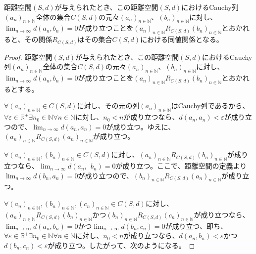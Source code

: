 \documentclass[dvipdfmx]{jsarticle}
\begin{document}
\begin{thm}\label{8.2.6.2}
距離空間$(S,d)$が与えられたとき、この距離空間$(S,d)$におけるCauchy列$\left( a_{n} \right)_{n \in \mathbb{N}}$全体の集合$C(S,d)$の元々$\left( a_{n} \right)_{n \in \mathbb{N}}$、$\left( b_{n} \right)_{n \in \mathbb{N}}$に対し、$\lim_{n \rightarrow \infty}{d\left( a_{n},b_{n} \right)} = 0$が成り立つことを$\left( a_{n} \right)_{n \in \mathbb{N}}R_{C(S,d)}\left( b_{n} \right)_{n \in \mathbb{N}}$とおかれると、その関係$R_{C(S,d)}$はその集合$C(S,d)$における同値関係となる。
\end{thm}
\begin{proof}
距離空間$(S,d)$が与えられたとき、この距離空間$(S,d)$におけるCauchy列$\left( a_{n} \right)_{n \in \mathbb{N}}$全体の集合$C(S,d)$の元々$\left( a_{n} \right)_{n \in \mathbb{N}}$、$\left( b_{n} \right)_{n \in \mathbb{N}}$に対し、$\lim_{n \rightarrow \infty}{d\left( a_{n},b_{n} \right)} = 0$が成り立つことを$\left( a_{n} \right)_{n \in \mathbb{N}}R_{C(S,d)}\left( b_{n} \right)_{n \in \mathbb{N}}$とおかれるとする。\par
$\forall\left( a_{n} \right)_{n \in \mathbb{N}} \in C(S,d)$に対し、その元の列$\left( a_{n} \right)_{n \in \mathbb{N}}$はCauchy列であるから、$\forall\varepsilon \in \mathbb{R}^{+}\exists n_{0} \in \mathbb{N}\forall n \in \mathbb{N}$に対し、$n_{0} < n$が成り立つなら、$d\left( a_{n},a_{n} \right) < \varepsilon$が成り立つので、$\lim_{n \rightarrow \infty}{d\left( a_{n},a_{n} \right)} = 0$が成り立つ。ゆえに、$\left( a_{n} \right)_{n \in \mathbb{N}}R_{C(S,d)}\left( a_{n} \right)_{n \in \mathbb{N}}$が成り立つ。\par
$\forall\left( a_{n} \right)_{n \in \mathbb{N}},\left( b_{n} \right)_{n \in \mathbb{N}} \in C(S,d)$に対し、$\left( a_{n} \right)_{n \in \mathbb{N}}R_{C(S,d)}\left( b_{n} \right)_{n \in \mathbb{N}}$が成り立つなら、$\lim_{n \rightarrow \infty}{d\left( a_{n},\ \ b_{n} \right)} = 0$が成り立つ。ここで、距離空間の定義より$\lim_{n \rightarrow \infty}{d\left( b_{n},a_{n} \right)} = 0$が成り立つので、$\left( b_{n} \right)_{n \in \mathbb{N}}R_{C(S,d)}\left( a_{n} \right)_{n \in \mathbb{N}}$が成り立つ。\par
$\forall\left( a_{n} \right)_{n \in \mathbb{N}},\left( b_{n} \right)_{n \in \mathbb{N}},\left( c_{n} \right)_{n \in \mathbb{N}} \in C(S,d)$に対し、$\left( a_{n} \right)_{n \in \mathbb{N}}R_{C(S,d)}\left( b_{n} \right)_{n \in \mathbb{N}}$かつ$\left( b_{n} \right)_{n \in \mathbb{N}}R_{C(S,d)}\left( c_{n} \right)_{n \in \mathbb{N}}$が成り立つなら、$\lim_{n \rightarrow \infty}{d\left( a_{n},b_{n} \right)} = 0$かつ$\lim_{n \rightarrow \infty}{d\left( b_{n},c_{n} \right)} = 0$が成り立つ、即ち、$\forall\varepsilon \in \mathbb{R}^{+}\exists n_{0} \in \mathbb{N}\forall n \in \mathbb{N}$に対し、$n_{0} < n$が成り立つなら、$d\left( a_{n},b_{n} \right) < \varepsilon$かつ$d\left( b_{n},c_{n} \right) < \varepsilon$が成り立つ。したがって、次のようになる。

\end{proof}
\end{document}
